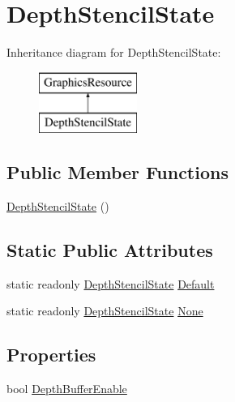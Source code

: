 \hypertarget{classMicrosoft_1_1Xna_1_1Framework_1_1Graphics_1_1DepthStencilState}{}\section{Depth\+Stencil\+State}
\label{classMicrosoft_1_1Xna_1_1Framework_1_1Graphics_1_1DepthStencilState}
Inheritance diagram for Depth\+Stencil\+State\+:\begin{figure}[H]
\begin{center}
\leavevmode
\includegraphics[height=2.000000cm]{classMicrosoft_1_1Xna_1_1Framework_1_1Graphics_1_1DepthStencilState}
\end{center}
\end{figure}
\subsection*{Public Member Functions}
\begin{DoxyCompactItemize}
\item 
\hyperlink{classMicrosoft_1_1Xna_1_1Framework_1_1Graphics_1_1DepthStencilState_af2b293712fe8e47cc12e64d2b1e10f5d}{Depth\+Stencil\+State} ()
\end{DoxyCompactItemize}
\subsection*{Static Public Attributes}
\begin{DoxyCompactItemize}
\item 
static readonly \hyperlink{classMicrosoft_1_1Xna_1_1Framework_1_1Graphics_1_1DepthStencilState}{Depth\+Stencil\+State} \hyperlink{classMicrosoft_1_1Xna_1_1Framework_1_1Graphics_1_1DepthStencilState_a29158edaed14951029d22b74c6c35d0f}{Default}
\item 
static readonly \hyperlink{classMicrosoft_1_1Xna_1_1Framework_1_1Graphics_1_1DepthStencilState}{Depth\+Stencil\+State} \hyperlink{classMicrosoft_1_1Xna_1_1Framework_1_1Graphics_1_1DepthStencilState_a7c781654f248acd08b647a2b2534664a}{None}
\end{DoxyCompactItemize}
\subsection*{Properties}
\begin{DoxyCompactItemize}
\item 
bool \hyperlink{classMicrosoft_1_1Xna_1_1Framework_1_1Graphics_1_1DepthStencilState_a59f2103cdc1fd7535663caba83e16b2a}{Depth\+Buffer\+Enable}
\end{DoxyCompactItemize}


